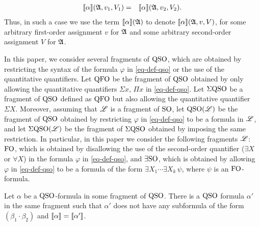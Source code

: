 \begin{eqnarray*}
	{\llbracket{}{\alpha}\rrbracket}(\mathfrak{A}, v_1, V_1) & = & {\llbracket{}{\alpha}\rrbracket}(\mathfrak{A}, v_2, V_2).
\end{eqnarray*}
Thus, in such a case we use the term ${\llbracket{}{\alpha}\rrbracket}(\mathfrak{A})$ to denote ${\llbracket{}{\alpha}\rrbracket}(\mathfrak{A}, v, V)$, for some arbitrary first-order assignment $v$ for $\mathfrak{A}$ and some arbitrary second-order assignment $V$ for $\mathfrak{A}$. 

In this paper, we consider several fragments of ${\rm QSO}$, which are obtained by restricting the syntax of the formula $\varphi$ in \eqref{eq-def-qso} or the use of the quantitative quantifiers. Let ${\rm QFO}$ be the fragment of ${\rm QSO}$ obtained by only allowing the quantitative quantifiers $\Sigma x$, $\Pi x$ in \eqref{eq-def-qso}. Let $\Sigma{\rm QSO}$ be a fragment of ${\rm QSO}$ defined as ${\rm QFO}$ but also allowing the quantitative quantifier $\Sigma X$. Moreover, assuming that $\mathscr{L}$ is a fragment of ${\rm SO}$, let ${\rm QSO}(\mathscr{L})$ be the fragment of ${\rm QSO}$ obtained by restricting $\varphi$ in \eqref{eq-def-qso} to be a formula in $\mathscr{L}$, and let $\Sigma{\rm QSO}(\mathscr{L})$ be the fragment of $\Sigma{\rm QSO}$ obtained by imposing the same restriction. In particular, in this paper we consider the following fragments $\mathscr{L}$: ${\rm FO}$, which is obtained by disallowing the use of the second-order quantifier ($\exists X$ or $\forall X$) in the formula $\varphi$ in \eqref{eq-def-qso}, and $\exists{\rm SO}$, which is obtained by allowing $\varphi$ in \eqref{eq-def-qso} to be a formula of the form $\exists X_1 \cdots \exists X_k \, \psi$, where $\psi$ is an ${\rm FO}$-formula. 

\begin{theorem} \label{no-mult}
	Let $\alpha$ be a ${\rm QSO}$-formula in some fragment of ${\rm QSO}$. There is a ${\rm QSO}$ formula $\alpha'$ in the same fragment such that $\alpha'$ does not have any subformula of the form $(\beta_1 \cdot \beta_2)$ and ${\llbracket{}{\alpha}\rrbracket} = {\llbracket{}{\alpha'}\rrbracket}$.
\end{theorem}
